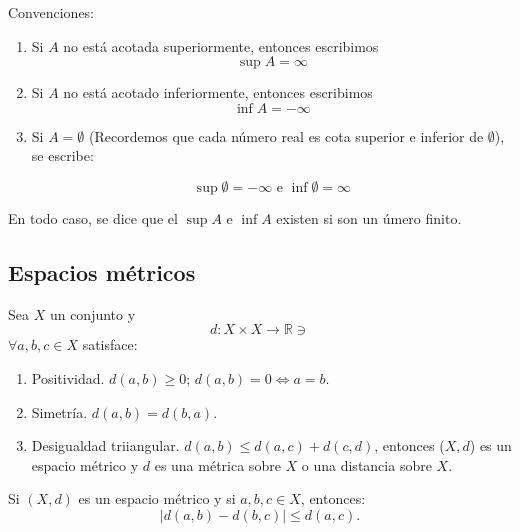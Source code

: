 \begin{cajita}
	Convenciones: 
	\begin{enumerate}
		\item Si $A$ no está acotada superiormente, entonces escribimos
	$$\sup A=\infty$$
\item Si $A$ no está acotado inferiormente, entonces escribimos 
$$\inf A=-\infty$$	
\item Si $A=\emptyset$ (Recordemos que cada número real es cota superior e inferior de $\emptyset$), se escribe: 

$$\sup \emptyset =-\infty \text{ e } \inf \emptyset = \infty$$
\end{enumerate}
\end{cajita}

\begin{nota}
	En todo caso, se dice que el $\sup A$ e $\inf A$ existen si son un úmero finito. 
\end{nota}

\subsection{Espacios métricos}

\begin{definicion}
	Sea $X$ un conjunto y 
	$$d: X\times X\to \mathbb{R} \ni$$
	$\forall a,b,c\in X$ satisface: 
	\begin{enumerate}
		\item Positividad. $d(a,b)\geq 0$; $d(a,b)=0\iff a=b$. 
		\item Simetría. $d(a,b)=d(b,a)$. 
		\item Desigualdad triiangular. $d(a,b)\leq d(a,c)+d(c,d)$, entonces ($X,d$) es un espacio métrico y $d$ es una métrica sobre $X$ o una distancia sobre $X$. 	\end{enumerate}
\end{definicion}

\begin{prop}
	Si $(X,d)$ es un espacio métrico y si $a,b,c\in X$, entonces: 
	$$|d(a,b)-d(b,c)|\leq d(a,c).$$
\end{prop}

